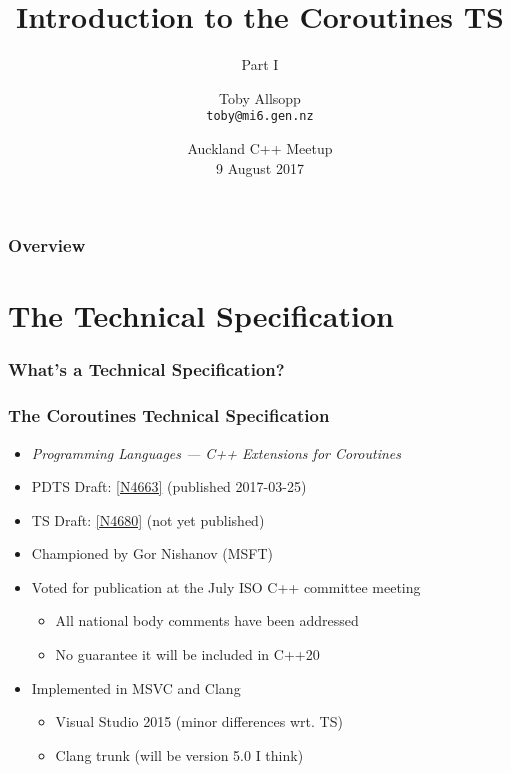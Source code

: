 \documentclass[aspectratio=43]{beamer}
\date{Auckland C++ Meetup\\9 August 2017}
\title{Introduction to the Coroutines TS}
\subtitle{Part I}
\author[Toby Allsopp]{Toby Allsopp\\\texttt{toby@mi6.gen.nz}}
\begin{document}
\frame{\titlepage}

\begin{frame}
  \frametitle{Overview}
  \tableofcontents
\end{frame}

\section{The Technical Specification}

\begin{frame}
\end{frame}

\begin{frame}
  \frametitle{What's a Technical Specification?}
\end{frame}

\begin{frame}
  \frametitle{The Coroutines Technical Specification}
  \begin{itemize}
  \item \emph{Programming Languages — C++ Extensions for Coroutines}
  \item PDTS Draft: \href{http://wg21.link/n4663}{[N4663]} (published 2017-03-25)
  \item TS Draft: \href{http://wg21.link/n4680}{[N4680]} (not yet published)
  \item Championed by Gor Nishanov (MSFT)
  \item Voted for publication at the July ISO C++ committee meeting
    \begin{itemize}
    \item All national body comments have been addressed
    \item No guarantee it will be included in C++20
    \end{itemize}
    \pause
  \item Implemented in MSVC and Clang
    \begin{itemize}
    \item Visual Studio 2015 (minor differences wrt. TS)
    \item Clang trunk (will be version 5.0 I think)
    \end{itemize}
  \end{itemize}
\end{frame}

\end{document}
